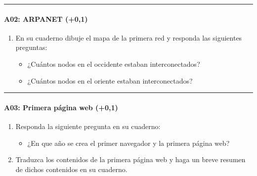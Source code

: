 \documentclass[letterpaper,10pt,spanish]{sphinxmanual}
\begin{document}
\bigskip\hrule\bigskip



\paragraph{A02: ARPANET (+0,1)}
\label{\detokenize{cursos/informatica10/periodo01/G01:a02-arpanet-0-1}}
\sphinxAtStartPar
{}
\begin{enumerate}
%
\item {} 
\sphinxAtStartPar
En su cuaderno dibuje el mapa de la primera red y responda las siguientes preguntas:
\begin{itemize}
\item {} 
\sphinxAtStartPar
¿Cuántos nodos en el occidente estaban interconectados?

\item {} 
\sphinxAtStartPar
¿Cuántos nodos en el oriente estaban interconectados?

\end{itemize}

\end{enumerate}


\bigskip\hrule\bigskip



\paragraph{A03: Primera página web (+0,1)}
\label{\detokenize{cursos/informatica10/periodo01/G01:a03-primera-pagina-web-0-1}}
\sphinxAtStartPar
{}
\begin{enumerate}
%
\item {} 
\sphinxAtStartPar
Responda la siguiente pregunta en su cuaderno:
\begin{itemize}
\item {} 
\sphinxAtStartPar
¿En que año se crea el primer navegador y la primera página web?

\end{itemize}

\item {} 
\sphinxAtStartPar
Traduzca los contenidos de la primera página web y haga un breve resumen de dichos contenidos en su cuaderno.

\end{enumerate}
\end{document}
